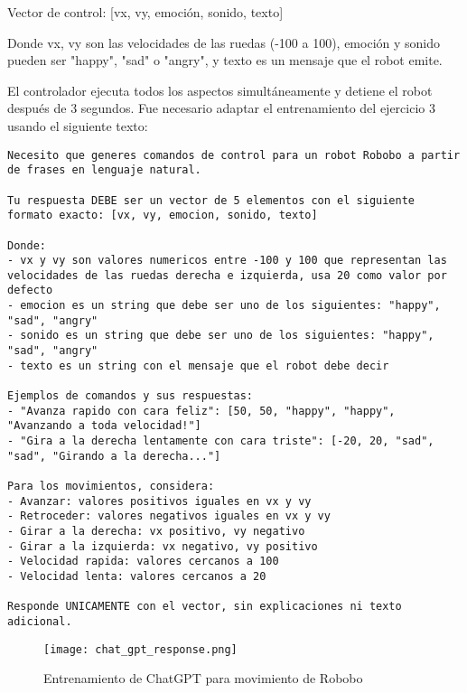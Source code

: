 \documentclass{article}
\begin{document}
Vector de control: [vx, vy, emoción, sonido, texto]

Donde vx, vy son las velocidades de las ruedas (-100 a 100), emoción y sonido pueden ser "happy", "sad" o "angry", y texto es un mensaje que el robot emite.

El controlador ejecuta todos los aspectos simultáneamente y detiene el robot después de 3 segundos. Fue necesario adaptar el entrenamiento del ejercicio 3 usando el siguiente texto:

\begin{lstlisting}
Necesito que generes comandos de control para un robot Robobo a partir de frases en lenguaje natural.

Tu respuesta DEBE ser un vector de 5 elementos con el siguiente formato exacto: [vx, vy, emocion, sonido, texto]

Donde:
- vx y vy son valores numericos entre -100 y 100 que representan las velocidades de las ruedas derecha e izquierda, usa 20 como valor por defecto
- emocion es un string que debe ser uno de los siguientes: "happy", "sad", "angry"
- sonido es un string que debe ser uno de los siguientes: "happy", "sad", "angry"
- texto es un string con el mensaje que el robot debe decir

Ejemplos de comandos y sus respuestas:
- "Avanza rapido con cara feliz": [50, 50, "happy", "happy", "Avanzando a toda velocidad!"]
- "Gira a la derecha lentamente con cara triste": [-20, 20, "sad", "sad", "Girando a la derecha..."]

Para los movimientos, considera:
- Avanzar: valores positivos iguales en vx y vy
- Retroceder: valores negativos iguales en vx y vy
- Girar a la derecha: vx positivo, vy negativo
- Girar a la izquierda: vx negativo, vy positivo                        
- Velocidad rapida: valores cercanos a 100
- Velocidad lenta: valores cercanos a 20

Responde UNICAMENTE con el vector, sin explicaciones ni texto adicional.
\end{lstlisting}


\newpage
\begin{figure}
    \centering
    \texttt{[image: chat\_gpt\_response.png]}
    \caption{Entrenamiento de ChatGPT para movimiento de Robobo}
    \label{fig:ej3}
\end{figure}
\end{document}
